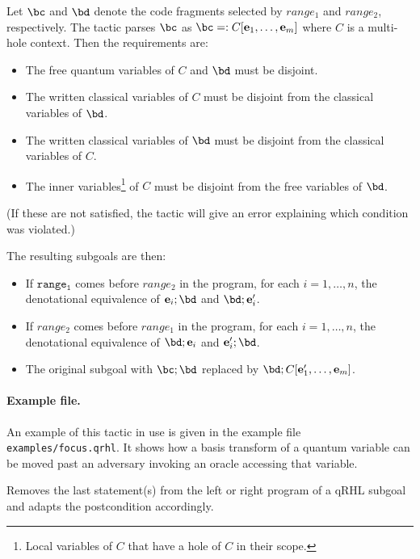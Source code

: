 \documentclass{article}
\begin{document}
Let $\bc$ and $\bd$ denote the code fragments selected by $\mathit{range_1}$ and $\mathit{range_2}$, respectively.
The tactic parses $\bc$ as $\bc=:C[\be_1,\dots,\be_m]$ where $C$ is a multi-hole context. Then the requirements are:
\begin{itemize}
\item The free quantum variables of $C$ and $\bd$ must be disjoint.
\item The written classical variables of $C$ must be disjoint from the classical variables of $\bd$.
\item The written classical variables of $\bd$ must be disjoint from the classical variables of $C$.
\item The inner variables\footnote{Local variables of $C$ that have a hole of $C$ in their scope.} of $C$ must be disjoint from the free variables of $\bd$.
\end{itemize}
(If these are not satisfied, the tactic will give an error explaining which condition was violated.)

The resulting subgoals are then:
\begin{itemize}
\item If $\mathtt{range_1}$ comes before $\mathit{range_2}$ in the program, for each $i=1,\dots,n$, the denotational equivalence of  ${\be_i;\bd}$ and $\bd;\be_i'$.
\item If $\mathit{range_2}$ comes before $\mathit{range_1}$ in the program, for each $i=1,\dots,n$, the denotational equivalence of   $\bd;\be_i$ and ${\be_i';\bd}$.
\item The original subgoal with $\bc;\bd$ replaced by $\bd;C[\be_1',\dots,\be_m]$.
\end{itemize}


\paragraph{Example file.} An example of this tactic in use is given in the example file \texttt{examples/focus.qrhl}.
It shows how a basis transform of a quantum variable can be moved past an adversary invoking an oracle accessing that variable.



Removes the last statement(s) from the left or right program of a qRHL
subgoal and adapts the postcondition accordingly.

\newcommand\WP{\operatorname{wp}}%
\end{document}
